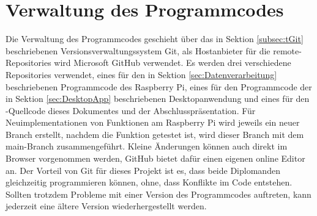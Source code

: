 \section{Verwaltung des Programmcodes}
\label{sec:CodeVerwaltung}
Die Verwaltung des Programmcodes geschieht über das in Sektion \ref{subsec:tGit} beschriebenen Versionsverwaltungssystem Git, als Hostanbieter für die remote-Repositories wird Microsoft GitHub verwendet. Es werden drei verschiedene Repositories verwendet, eines für den in Sektion \ref{sec:Datenverarbeitung} beschriebenen Programmcode des Raspberry Pi, eines für den Programmcode der in Sektion \ref{sec:DesktopApp} beschriebenen Desktopanwendung und eines für den -Quellcode dieses Dokumentes und der Abschlusspräsentation. Für Neuimplementationen von Funktionen am Raspberry Pi wird jeweils ein neuer Branch erstellt, nachdem die Funktion getestet ist, wird dieser Branch mit dem main-Branch zusammengeführt. Kleine Änderungen können auch direkt im Browser vorgenommen werden, GitHub bietet dafür einen eigenen online Editor an. Der Vorteil von Git für dieses Projekt ist es, dass beide Diplomanden gleichzeitig programmieren können, ohne, dass Konflikte im Code entstehen. Sollten trotzdem Probleme mit einer Version des Programmcodes auftreten, kann jederzeit eine ältere Version wiederhergestellt werden. 